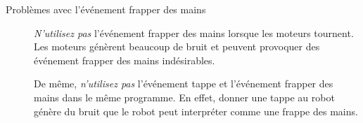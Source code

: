 \begin{description}
\item[Problèmes avec l'événement frapper des mains]
\emph{N'utilisez pas} l'événement frapper des mains  lorsque les moteurs tournent.
Les moteurs génèrent beaucoup de bruit et peuvent provoquer des événement frapper des mains
indésirables.

De même, \emph{n'utilisez pas} l'événement tappe  et l'événement frapper des mains
 dans le même programme.
En effet, donner une tappe au robot génère du bruit que le robot peut interpréter comme une frappe
des mains.

\end{description}
